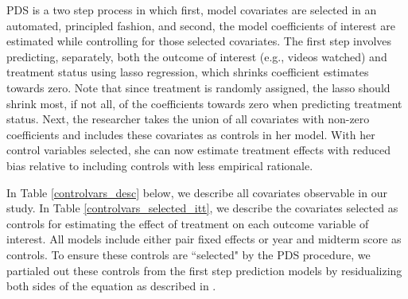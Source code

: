 \documentclass[12pt]{article}
\begin{document}
PDS is a two step process in which first, model covariates are selected in an automated, principled fashion, and second, the model coefficients of interest are estimated while controlling for those selected covariates. The first step involves predicting, separately, both the outcome of interest (e.g., videos watched) and treatment status using lasso regression, which shrinks coefficient estimates towards zero. Note that since treatment is randomly assigned, the lasso should shrink most, if not all, of the coefficients towards zero when predicting treatment status. Next, the researcher takes the union of all covariates with non-zero coefficients and includes these covariates as controls in her model. With her control variables selected, she can now estimate treatment effects with reduced bias relative to including controls with less empirical rationale.

In Table \ref{controlvars_desc} below, we describe all covariates observable in our study. In Table \ref{controlvars_selected_itt}, we describe the covariates selected as controls for estimating the effect of treatment on each outcome variable of interest. All models include either pair fixed effects or year and midterm score as controls. To ensure these controls are ``selected" by the PDS procedure, we partialed out these controls from the first step prediction models by residualizing both sides of the equation as described in \textcite{bch2014b}.

\clearpage



\clearpage



\clearpage



\clearpage



%
\end{document}
